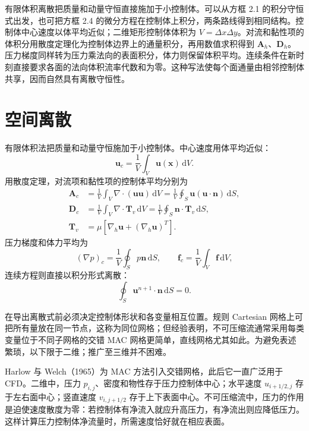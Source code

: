\documentclass[11pt,a4paper,openany,fontset=none]{ctexbook}
\begin{document}
有限体积离散把质量和动量守恒直接施加于小控制体。可以从方框 2.1 的积分守恒式出发，也可把方框 2.4 的微分方程在控制体上积分，两条路线得到相同结构。控制体中心速度以体平均近似；二维矩形控制体体积为 $V=\Delta x\Delta y$。对流和黏性项的体积分用散度定理化为控制体边界上的通量积分，再用数值求积得到 $\bm A_h$、$\bm D_h$。压力梯度同样转为压力乘法向的表面积分，体力则保留体积平均。连续条件在新时刻直接要求各面的法向体积流率代数和为零。这种写法使每个面通量由相邻控制体共享，因而自然具有离散守恒性。

\section{空间离散}

有限体积法把质量和动量守恒施加于小控制体。中心速度用体平均近似：
\begin{equation}
 \bm u_c=\frac1V\int_V\bm u(\bm x)\,\mathrm dV. \tag{3.16}
\end{equation}
用散度定理，对流项和黏性项的控制体平均分别为
\begin{align}
 \bm A_c&=\frac1V\int_V\nabla\cdot(\bm u\bm u)\,\mathrm dV
 =\frac1V\oint_S\bm u(\bm u\cdot\bm n)\,\mathrm dS, \tag{3.17}\\
 \bm D_c&=\frac1V\int_V\nabla\cdot\bm T_v\,\mathrm dV
 =\frac1V\oint_S\bm n\cdot\bm T_v\,\mathrm dS, \tag{3.18}\\
 \bm T_v&=\mu[\nabla_h\bm u+(\nabla_h\bm u)^T]. \tag{3.19}
\end{align}
压力梯度和体力平均为
\begin{equation}
 (\nabla p)_c=\frac1V\oint_Sp\bm n\,\mathrm dS,
 \qquad \bm f_c=\frac1V\int_V\bm f\,\mathrm dV, \tag{3.20--3.21}
\end{equation}
连续方程则直接以积分形式离散：
\begin{equation}
 \oint_S\bm u^{n+1}\cdot\bm n\,\mathrm dS=0. \tag{3.22}
\end{equation}

在导出离散式前必须决定控制体形状和各变量相互位置。规则 Cartesian 网格上可把所有量放在同一节点，这称为同位网格；但经验表明，不可压缩流通常采用每类变量位于不同子网格的交错 MAC 网格更简单，直线网格尤其如此。为避免表述繁琐，以下限于二维；推广至三维并不困难。

Harlow 与 Welch（1965）为 MAC 方法引入交错网格，此后它一直广泛用于 CFD。二维中，压力 $p_{i,j}$、密度和物性存于压力控制体中心；水平速度 $u_{i+1/2,j}$ 存于左右面中心；竖直速度 $v_{i,j+1/2}$ 存于上下表面中心。不可压缩流中，压力的作用是迫使速度散度为零：若控制体有净流入就应升高压力，有净流出则应降低压力。这样计算压力控制体净流量时，所需速度恰好就在相应表面。
\end{document}
